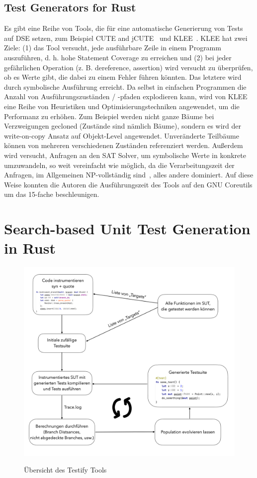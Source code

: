 \documentclass{article}
\begin{document}
\subsection{Test Generators for Rust}
Es gibt eine Reihe von Tools, die für eine automatische Generierung von Tests auf DSE setzen, zum Beispiel CUTE and jCUTE~\cite{Sen2006} und KLEE~\cite{cadar2008klee}. 
KLEE hat zwei Ziele: (1) das Tool versucht, jede ausführbare Zeile in einem Programm auszuführen, d. h. hohe Statement Coverage zu erreichen und (2) bei jeder gefährlichen Operation (z. B. dereference, assertion) wird versucht zu überprüfen, ob es Werte gibt, die dabei zu einem Fehler führen könnten. Das letztere wird durch symbolische Ausführung erreicht. Da selbst in einfachen Programmen die Anzahl von Ausführungszuständen / -pfaden explodieren kann, wird von KLEE eine Reihe von Heuristiken und Optimisierungstechniken angewendet, um die Performanz zu erhöhen. Zum Beispiel werden nicht ganze Bäume bei Verzweigungen gecloned (Zustände sind nämlich Bäume), sondern es wird der write-on-copy Ansatz auf Objekt-Level angewendet. Unveränderte Teilbäume können von mehreren verschiedenen Zuständen referenziert werden. Außerdem wird versucht, Anfragen an den SAT Solver, um symbolische Werte in konkrete umzuwandeln, so weit vereinfacht wie möglich, da die Verarbeitungszeit der Anfragen, im Allgemeinen NP-vollständig sind~\cite{Lewis1983}, alles andere dominiert. Auf diese Weise konnten die Autoren die Ausführungszeit des Tools auf den GNU Coreutils um das 15-fache beschleunigen.

\section{Search-based Unit Test Generation in Rust}
\begin{figure}[h]
\caption{Übersicht des Testify Tools}
\centering
\includegraphics[width=\textwidth]{testify-overview}
\label{fig:testify-overview}
\end{figure}
\end{document}
